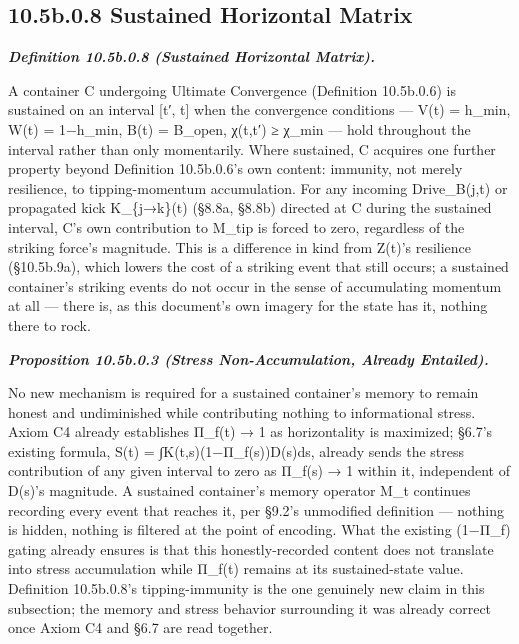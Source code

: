 \documentclass[
]{article}
\begin{document}
\hypertarget{b.0.8-sustained-horizontal-matrix}{%
\subsection{10.5b.0.8 Sustained Horizontal
Matrix}\label{b.0.8-sustained-horizontal-matrix}}

\emph{\textbf{Definition 10.5b.0.8 (Sustained Horizontal Matrix).}}

A container C undergoing Ultimate Convergence (Definition 10.5b.0.6) is
sustained on an interval {[}t′, t{]} when the convergence conditions ---
V(t) = h\_min, W(t) = 1−h\_min, B(t) = B\_open, χ(t,t′) ≥ χ\_min ---
hold throughout the interval rather than only momentarily. Where
sustained, C acquires one further property beyond Definition 10.5b.0.6's
own content: immunity, not merely resilience, to tipping-momentum
accumulation. For any incoming Drive\_B(j,t) or propagated kick
K\_\{j→k\}(t) (§8.8a, §8.8b) directed at C during the sustained
interval, C's own contribution to M\_tip is forced to zero, regardless
of the striking force's magnitude. This is a difference in kind from
Z(t)'s resilience (§10.5b.9a), which lowers the cost of a striking event
that still occurs; a sustained container's striking events do not occur
in the sense of accumulating momentum at all --- there is, as this
document's own imagery for the state has it, nothing there to rock.

\emph{\textbf{Proposition 10.5b.0.3 (Stress Non-Accumulation, Already
Entailed).}}

No new mechanism is required for a sustained container's memory to
remain honest and undiminished while contributing nothing to
informational stress. Axiom C4 already establishes Π\_f(t) → 1 as
horizontality is maximized; §6.7's existing formula, S(t) =
∫K(t,s)(1−Π\_f(s))D(s)ds, already sends the stress contribution of any
given interval to zero as Π\_f(s) → 1 within it, independent of D(s)'s
magnitude. A sustained container's memory operator M\_t continues
recording every event that reaches it, per §9.2's unmodified definition
--- nothing is hidden, nothing is filtered at the point of encoding.
What the existing (1−Π\_f) gating already ensures is that this
honestly-recorded content does not translate into stress accumulation
while Π\_f(t) remains at its sustained-state value. Definition
10.5b.0.8's tipping-immunity is the one genuinely new claim in this
subsection; the memory and stress behavior surrounding it was already
correct once Axiom C4 and §6.7 are read together.
\end{document}
